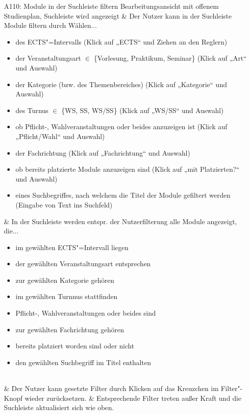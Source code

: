 \begin{usecase}{A110: Module in der Suchleiste filtern}
	Bearbeitungsansicht mit offenem Studienplan, Suchleiste wird angezeigt
	& Der Nutzer kann in der Suchleiste Module filtern durch Wählen...
	\begin{itemize}[nosep,leftmargin=12pt]
		\item des ECTS"=Intervalls (Klick auf „ECTS“ und Ziehen an den Reglern)
		\item der Veranstaltungsart $\in$ \{Vorlesung, Praktikum, Seminar\} (Klick auf „Art“ und Auswahl)
		\item der Kategorie (bzw. des Themenbereiches) (Klick auf „Kategorie“ und Auswahl)
		\item des Turnus $\in$ \{WS, SS, WS/SS\} (Klick auf „WS/SS“ und Auswahl)
		\item ob Pflicht-, Wahlveranstaltungen oder beides anzuzeigen ist (Klick auf „Pflicht/Wahl“ und Auswahl)
		\item der Fachrichtung (Klick auf „Fachrichtung“ und Auswahl)
		\item ob bereits platzierte Module anzuzeigen sind (Klick auf „mit Platzierten?“ und Auswahl)
		\item eines Suchbegriffes, nach welchem die Titel der Module gefiltert werden (Eingabe von Text ins Suchfeld)
	\end{itemize}\hspace{0pt}\vspace{-\baselineskip}
	& In der Suchleiste werden entspr. der Nutzerfilterung alle Module angezeigt, die...
	\begin{itemize}[nosep,leftmargin=12pt]
		\item im gewählten ECTS"=Intervall liegen
		\item der gewählten Veranstaltungsart entsprechen
		\item zur gewählten Kategorie gehören
		\item im gewählten Turnnus stattfinden
		\item Pflicht-, Wahlveranstaltungen oder beides sind
		\item zur gewählten Fachrichtung gehören
		\item bereits platziert worden sind oder nicht
		\item den gewählten Suchbegriff im Titel enthalten
	\end{itemize}\hspace{0pt}\vspace{-\baselineskip} \\
	\hline
	& Der Nutzer kann gesetzte Filter durch Klicken auf das Kreuzchen im Filter"-Knopf wieder zurücksetzen.
	& Entsprechende Filter treten außer Kraft und die Suchleiste aktualisiert sich wie oben.
\end{usecase}

